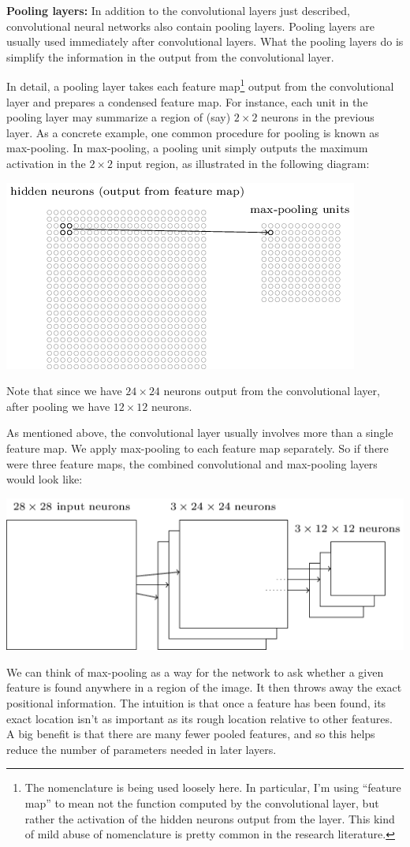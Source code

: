 \documentclass[a4paper,twoside,10pt]{book}
\begin{document}
\textbf{Pooling layers:} In addition to the convolutional layers just described, convolutional neural networks also contain pooling layers. Pooling layers are usually used immediately after convolutional layers. What the pooling layers do is simplify the information in the output from the convolutional layer.

In detail, a pooling layer takes each feature map\footnote{The nomenclature is being used loosely here. In particular, I'm using ``feature map'' to mean not the function computed by the convolutional layer, but rather the activation of the hidden neurons output from the layer. This kind of mild abuse of nomenclature is pretty common in the research literature.} output from the convolutional layer and prepares a condensed feature map. For instance, each unit in the pooling layer may summarize a region of (say) $2\times2$ neurons in the previous layer. As a concrete example, one common procedure for pooling is known as max-pooling. In max-pooling, a pooling unit simply outputs the maximum activation in the $2\times2$ input region, as illustrated in the following diagram:
\begin{center}
	\includegraphics[height=0.3\linewidth]{figures/ch6/tikz47}
\end{center}
Note that since we have $24\times24$ neurons output from the convolutional layer, after pooling we have $12\times12$ neurons.

As mentioned above, the convolutional layer usually involves more than a single feature map. We apply max-pooling to each feature map separately. So if there were three feature maps, the combined convolutional and max-pooling layers would look like:
\begin{center}
	\includegraphics[height=0.3\linewidth]{figures/ch6/tikz48}
\end{center}
We can think of max-pooling as a way for the network to ask whether a given feature is found anywhere in a region of the image. It then throws away the exact positional information. The intuition is that once a feature has been found, its exact location isn't as important as its rough location relative to other features. A big benefit is that there are many fewer pooled features, and so this helps reduce the number of parameters needed in later layers.
\end{document}
